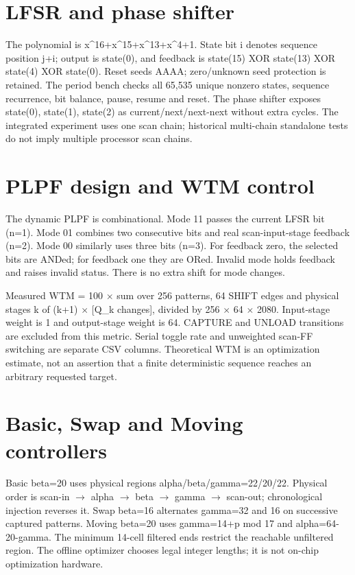 \documentclass[11pt,a4paper]{article}
\begin{document}
\section{LFSR and phase shifter}


The polynomial is x\textasciicircum{}16+x\textasciicircum{}15+x\textasciicircum{}13+x\textasciicircum{}4+1. State bit i denotes sequence position j+i; output is state(0), and feedback is state(15) XOR state(13) XOR state(4) XOR state(0). Reset seeds AAAA; zero/unknown seed protection is retained. The period bench checks all 65,535 unique nonzero states, sequence recurrence, bit balance, pause, resume and reset. The phase shifter exposes state(0), state(1), state(2) as current/next/next-next without extra cycles. The integrated experiment uses one scan chain; historical multi-chain standalone tests do not imply multiple processor scan chains.



\section{PLPF design and WTM control}


The dynamic PLPF is combinational. Mode 11 passes the current LFSR bit (n=1). Mode 01 combines two consecutive bits and real scan-input-stage feedback (n=2). Mode 00 similarly uses three bits (n=3). For feedback zero, the selected bits are ANDed; for feedback one they are ORed. Invalid mode holds feedback and raises invalid status. There is no extra shift for mode changes.



Measured WTM = 100 $\times$ sum over 256 patterns, 64 SHIFT edges and physical stages k of (k+1) $\times$ [Q\_k changes], divided by 256 $\times$ 64 $\times$ 2080. Input-stage weight is 1 and output-stage weight is 64. CAPTURE and UNLOAD transitions are excluded from this metric. Serial toggle rate and unweighted scan-FF switching are separate CSV columns. Theoretical WTM is an optimization estimate, not an assertion that a finite deterministic sequence reaches an arbitrary requested target.



\section{Basic, Swap and Moving controllers}


Basic beta=20 uses physical regions alpha/beta/gamma=22/20/22. Physical order is scan-in $\rightarrow$ alpha $\rightarrow$ beta $\rightarrow$ gamma $\rightarrow$ scan-out; chronological injection reverses it. Swap beta=16 alternates gamma=32 and 16 on successive captured patterns. Moving beta=20 uses gamma=14+p mod 17 and alpha=64-20-gamma. The minimum 14-cell filtered ends restrict the reachable unfiltered region. The offline optimizer chooses legal integer lengths; it is not on-chip optimization hardware.
\end{document}
